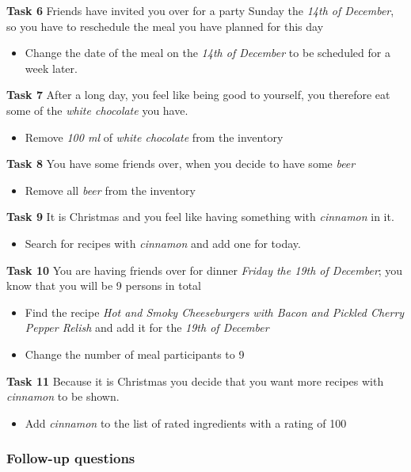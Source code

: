 \textbf{Task 6}
Friends have invited you over for a party Sunday the \textit{14th of December}, so you have to reschedule the meal you have planned for this day
\begin{itemize}
    \item Change the date of the meal on the \textit{14th of December} to be scheduled for a week later.
\end{itemize}

\textbf{Task 7}
After a long day, you feel like being good to yourself, you therefore eat some of the \textit{white chocolate} you have.
\begin{itemize}
    \item Remove \textit{100 ml} of \textit{white chocolate} from the inventory
\end{itemize}

\textbf{Task 8}
You have some friends over, when you decide to have some \textit{beer}
\begin{itemize}
    \item Remove all \textit{beer} from the inventory
\end{itemize}

\textbf{Task 9}
It is Christmas and you feel like having something with \textit{cinnamon} in it.
\begin{itemize}
    \item Search for recipes with \textit{cinnamon} and add one for today.
\end{itemize}

\textbf{Task 10}
You are having friends over for dinner \textit{Friday the 19th of December}; you know that you will be 9 persons in total
\begin{itemize}
    \item Find the recipe \textit{Hot and Smoky Cheeseburgers with Bacon and Pickled Cherry Pepper Relish} and add it for the \textit{19th of December}
    \item Change the number of meal participants to 9
\end{itemize}

\textbf{Task 11}
Because it is Christmas you decide that you want more recipes with \textit{cinnamon} to be shown.
\begin{itemize}
    \item Add \textit{cinnamon} to the list of rated ingredients with a rating of 100
\end{itemize}

\subsubsection{Follow-up questions}

